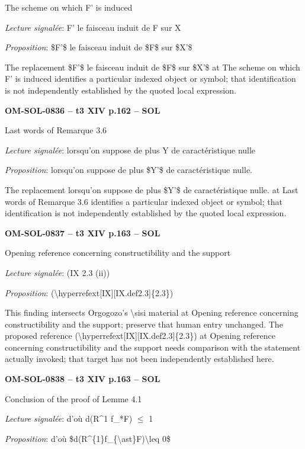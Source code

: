 The scheme on which F' is induced\par
\emph{Lecture signalée}: F' le faisceau induit de F sur X\par
\emph{Proposition}: \$F'\$ le faisceau induit de \$F\$ sur \$X'\$\par
The replacement \$F'\$ le faisceau induit de \$F\$ sur \$X'\$ at The scheme on which F' is induced identifies a particular indexed object or symbol; that identification is not independently established by the quoted local expression.\par
\par\noindent\textbf{OM-SOL-0836 -- t3 XIV p.162 -- SOL}\par
Last words of Remarque 3.6\par
\emph{Lecture signalée}: lorsqu'on suppose de plus Y de caractéristique nulle\par
\emph{Proposition}: lorsqu'on suppose de plus \$Y'\$ de caractéristique nulle.\par
The replacement lorsqu'on suppose de plus \$Y'\$ de caractéristique nulle. at Last words of Remarque 3.6 identifies a particular indexed object or symbol; that identification is not independently established by the quoted local expression.\par
\par\noindent\textbf{OM-SOL-0837 -- t3 XIV p.163 -- SOL}\par
Opening reference concerning constructibility and the support\par
\emph{Lecture signalée}: (IX 2.3 (ii))\par
\emph{Proposition}: (\textbackslash{}hyperrefext[IX][IX.def2.3]\{2.3\})\par
This finding intersects Orgogozo's \textbackslash{}sisi material at Opening reference concerning constructibility and the support; preserve that human entry unchanged. The proposed reference (\textbackslash{}hyperrefext[IX][IX.def2.3]\{2.3\}) at Opening reference concerning constructibility and the support needs comparison with the statement actually invoked; that target has not been independently established here.\par
\par\noindent\textbf{OM-SOL-0838 -- t3 XIV p.163 -- SOL}\par
Conclusion of the proof of Lemme 4.1\par
\emph{Lecture signalée}: d'où d(R\textasciicircum{}1 f\_*F) \ensuremath{\leq} 1\par
\emph{Proposition}: d'où \$d(R\textasciicircum{}\{1\}f\_\{\textbackslash{}ast\}F)\textbackslash{}leq 0\$\par
